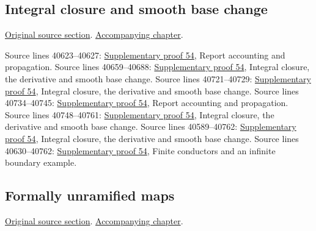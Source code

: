 \subsection{Integral closure and smooth base change}
\hypertarget{algebra-source-section-integral-closure-smooth-base-change}{}
\noindent\href{https://github.com/stacks/stacks-project/blob/a04446e57ec1fbc252a871afcec7752fb2807b14/algebra.tex\#L40586}{Original source section}. \href{algebra.pdf\#nameddest=section-integral-closure-smooth-base-change}{Accompanying chapter}.

\begin{AlgebraSourceRoutes}
 Source lines 40623--40627: \hyperlink{algebra_local_integral_notes_20260928}{Supplementary proof 54}, Report accounting and propagation.
 Source lines 40659--40688: \hyperlink{algebra_local_integral_notes_20260928}{Supplementary proof 54}, Integral closure, the derivative and smooth base change.
 Source lines 40721--40729: \hyperlink{algebra_local_integral_notes_20260928}{Supplementary proof 54}, Integral closure, the derivative and smooth base change.
 Source lines 40734--40745: \hyperlink{algebra_local_integral_notes_20260928}{Supplementary proof 54}, Report accounting and propagation.
 Source lines 40748--40761: \hyperlink{algebra_local_integral_notes_20260928}{Supplementary proof 54}, Integral closure, the derivative and smooth base change.
 Source lines 40589--40762: \hyperlink{algebra_local_integral_notes_20260928}{Supplementary proof 54}, Integral closure, the derivative and smooth base change.
 Source lines 40630--40762: \hyperlink{algebra_local_integral_notes_20260928}{Supplementary proof 54}, Finite conductors and an infinite boundary example.
\end{AlgebraSourceRoutes}

\subsection{Formally unramified maps}
\hypertarget{algebra-source-section-formally-unramified}{}
\noindent\href{https://github.com/stacks/stacks-project/blob/a04446e57ec1fbc252a871afcec7752fb2807b14/algebra.tex\#L40769}{Original source section}. \href{algebra.pdf\#nameddest=section-formally-unramified}{Accompanying chapter}.

